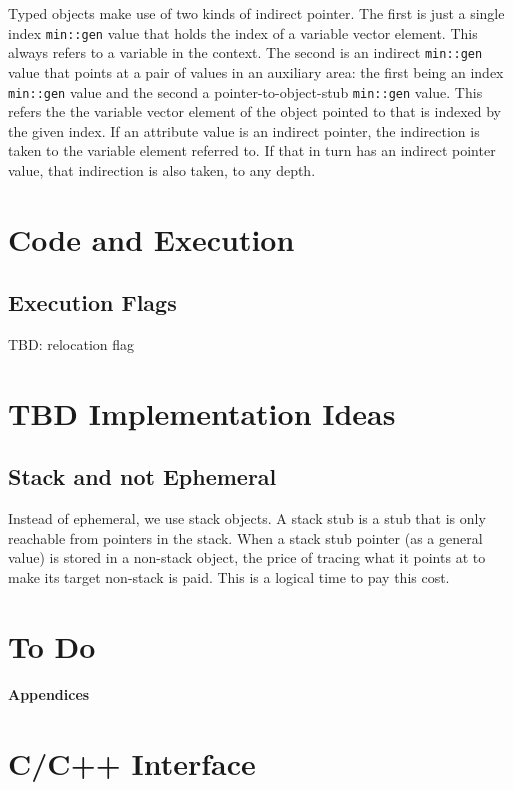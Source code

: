 \documentclass[12pt]{article}
\begin{document}
Typed objects make use of two kinds of indirect pointer.  The first is
just a single index \verb|min::gen| value that holds the index of a
variable vector element.  This always refers to a variable in the context.
The second is an indirect \verb|min::gen| value that points at a pair
of values in an auxiliary area: the first being an index \verb|min::gen|
value and the second a pointer-to-object-stub \verb|min::gen| value.
This refers the the variable vector element of the object pointed to
that is indexed by the given index.  If an attribute value is an indirect
pointer, the indirection is taken to the variable element referred to.
If that in turn has an indirect pointer value, that indirection is also
taken, to any depth.

\section{Code and Execution}

\subsection{Execution Flags}
\label{EXECUTION-FLAGS}

TBD: relocation flag

\section{TBD Implementation Ideas}


\subsection{Stack and not Ephemeral}

Instead of ephemeral, we use stack objects.  A stack stub is a stub that
is only reachable from pointers in the stack.   When a stack stub
pointer (as a general value) is stored in a non-stack object, the price
of tracing what it points at to make its target non-stack is paid.
This is a logical time to pay this cost.

\section{To Do}

\clearpage

\appendix

\centerline{\Large \bf Appendices}

\section{C/C++ Interface}
\label{C/C++-Interface}
\end{document}
